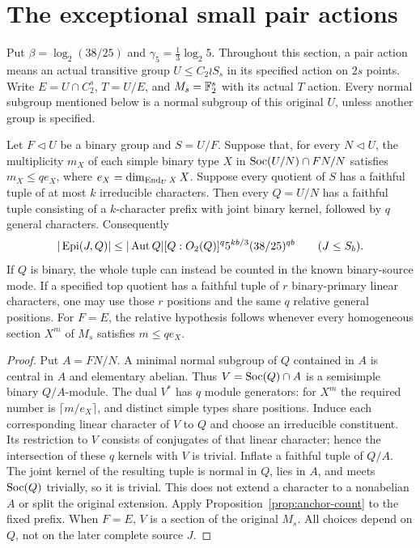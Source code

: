 \section{The exceptional small pair actions}
\label{sec:exceptional-pairs}
Put $\beta=\log_2(38/25)$ and $\gamma_5=\frac13\log_2 5$.
Throughout this section, a pair action means an actual transitive group
$U\leq C_2\wr S_s$ in its specified action on $2s$ points. Write
$E=U\cap C_2^s$, $T=U/E$, and $M_s=\mathbb F_2^s$ with its actual $T$ action.
Every normal subgroup mentioned below is a normal subgroup of this
original $U$, unless another group is specified.

\begin{lemma}\label{lem:pair-relative}
Let $F\lhd U$ be a binary group and $S=U/F$. Suppose that, for every
$N\lhd U$, the multiplicity $m_X$ of each simple binary type $X$ in
$\operatorname{Soc}(U/N)\cap FN/N$ satisfies $m_X\leq q e_X$, where
$e_X=\dim_{\operatorname{End}_U X}X$. Suppose every quotient of $S$ has a faithful
tuple of at most $k$ irreducible characters. Then every $Q=U/N$ has a
faithful tuple consisting of a $k$-character prefix with joint binary
kernel, followed by $q$ general characters. Consequently
\[
 |\operatorname{Epi}(J,Q)|\leq |\operatorname{Aut} Q|[Q:O_2(Q)]^q
                   5^{kb/3}(38/25)^{qb}\qquad(J\leq S_b).
\]
If $Q$ is binary, the whole tuple can instead be counted in the known
binary-source mode. If a specified top quotient has a faithful tuple of
$r$ binary-primary linear characters, one may use those $r$ positions
and the same $q$ relative general positions.
For $F=E$, the relative hypothesis follows whenever every homogeneous
section $X^m$ of $M_s$ satisfies $m\leq q e_X$.
\end{lemma}
\begin{proof}
Put $A=FN/N$. A minimal normal subgroup of $Q$ contained in $A$ is
central in $A$ and elementary abelian. Thus $V=\operatorname{Soc}(Q)\cap A$ is a
semisimple binary $Q/A$-module. The dual $V^*$ has $q$ module generators:
for $X^m$ the required number is $\lceil m/e_X\rceil$, and distinct
simple types share positions. Induce each corresponding linear
character of $V$ to $Q$ and choose an irreducible constituent. Its
restriction to $V$ consists of conjugates of that linear character;
hence the intersection of these $q$ kernels with $V$ is trivial.
Inflate a faithful tuple of $Q/A$. The joint kernel of the resulting
tuple is normal in $Q$, lies in $A$, and meets $\operatorname{Soc}(Q)$ trivially,
so it is trivial. This does not extend a character to a nonabelian
$A$ or split the original extension. Apply
Proposition~\ref{prop:anchor-count} to the fixed prefix. When $F=E$,
$V$ is a section of the original $M_s$. All choices depend on $Q$,
not on the later complete source $J$.
\end{proof}

